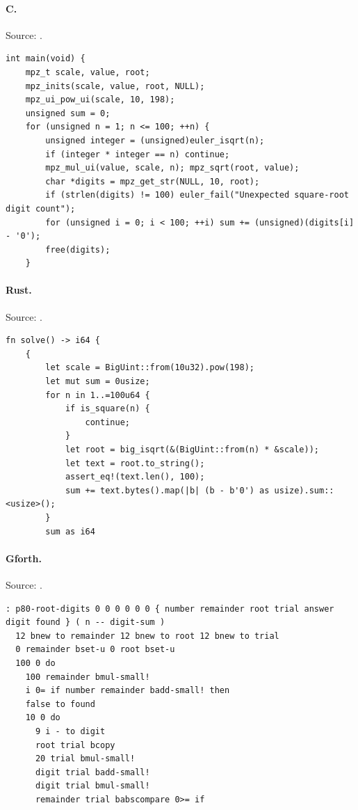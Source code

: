 \paragraph{C.} Source: .
\begin{lstlisting}
int main(void) {
    mpz_t scale, value, root;
    mpz_inits(scale, value, root, NULL);
    mpz_ui_pow_ui(scale, 10, 198);
    unsigned sum = 0;
    for (unsigned n = 1; n <= 100; ++n) {
        unsigned integer = (unsigned)euler_isqrt(n);
        if (integer * integer == n) continue;
        mpz_mul_ui(value, scale, n); mpz_sqrt(root, value);
        char *digits = mpz_get_str(NULL, 10, root);
        if (strlen(digits) != 100) euler_fail("Unexpected square-root digit count");
        for (unsigned i = 0; i < 100; ++i) sum += (unsigned)(digits[i] - '0');
        free(digits);
    }
\end{lstlisting}

\paragraph{Rust.} Source: .
\begin{lstlisting}
fn solve() -> i64 {
    {
        let scale = BigUint::from(10u32).pow(198);
        let mut sum = 0usize;
        for n in 1..=100u64 {
            if is_square(n) {
                continue;
            }
            let root = big_isqrt(&(BigUint::from(n) * &scale));
            let text = root.to_string();
            assert_eq!(text.len(), 100);
            sum += text.bytes().map(|b| (b - b'0') as usize).sum::<usize>();
        }
        sum as i64
\end{lstlisting}

\paragraph{Gforth.} Source: .
\begin{lstlisting}
: p80-root-digits 0 0 0 0 0 0 { number remainder root trial answer digit found } ( n -- digit-sum )
  12 bnew to remainder 12 bnew to root 12 bnew to trial
  0 remainder bset-u 0 root bset-u
  100 0 do
    100 remainder bmul-small!
    i 0= if number remainder badd-small! then
    false to found
    10 0 do
      9 i - to digit
      root trial bcopy
      20 trial bmul-small!
      digit trial badd-small!
      digit trial bmul-small!
      remainder trial babscompare 0>= if
\end{lstlisting}

